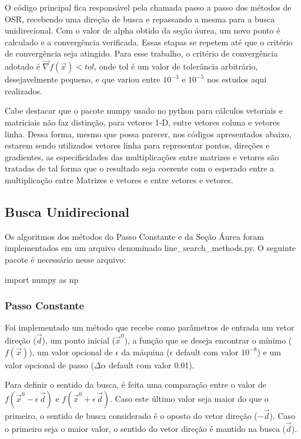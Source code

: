 \documentclass[10pt, a4paper]{article}
\begin{document}
O código principal fica responsável pela chamada passo a passo dos métodos de OSR,
recebendo uma direção de busca e repassando a mesma para a busca unidirecional.
Com o valor de alpha obtido da seção áurea, um novo ponto é calculado e a convergência verificada. Essas etapas se repetem até que o critério de convergência seja atingido.
Para esse trabalho, o critério de convergência adotado é $\overrightarrow{\nabla}f(\overrightarrow{x}) < tol$, onde tol é um valor de tolerância arbitrário, desejavelmente pequeno, e que variou entre $10^{-3}$ e $10^{-5}$ nos estudos aqui realizados.

Cabe destacar que o pacote numpy usado no python para cálculos vetoriais e matriciais não faz distinção,
para vetores 1-D, entre vetores coluna e vetores linha. Dessa forma, mesmo que possa parecer, nos códigos apresentados abaixo,
estarem sendo utilizados vetores linha para representar pontos, direções e gradientes, as especificidades das multiplicações
entre matrizes e vetores são tratadas de tal forma que o resultado seja coerente com o esperado entre a multiplicação
entre Matrizes e vetores e entre vetores e vetores.

\subsection{Busca Unidirecional}

Os algoritmos dos métodos do Passo Constante e da Seção Áurea foram implementados em um arquivo denominado line\_search\_methods.py.
O seguinte pacote é necessário nesse arquivo: 
\begin{python}
  import numpy as np
\end{python}

\subsubsection{Passo Constante}


Foi implementado um método que recebe como parâmetros de entrada um vetor direção ($\overrightarrow{d}$),
um ponto inicial ($\overrightarrow{x}^0$), 
a função que se deseja encontrar o mínimo ($f(\overrightarrow{x})$),
um valor opcional de $\epsilon$ da máquina ($\epsilon$ default com valor $10^{-8}$) e
um valor opcional de passo ($\Delta\alpha$ default com valor 0.01).

Para definir o sentido da busca, é feita uma comparação entre o valor de $f(\overrightarrow{x}^0-\epsilon\,\overrightarrow{d})$ e $f(\overrightarrow{x}^0+\epsilon\,\overrightarrow{d})$.
Caso este último valor seja maior do que o primeiro, o sentido de busca considerado é o oposto do vetor direção ($-\overrightarrow{d}$). Caso o primeiro seja
o maior valor, o sentido do vetor direção é mantido na busca ($\overrightarrow{d}$).
\end{document}
